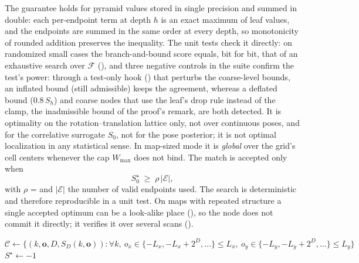 The guarantee holds for pyramid values stored in single precision and summed in double: each per-endpoint term at depth $h$ is an exact maximum of leaf values, and the endpoints are summed in the same order at every depth, so monotonicity of rounded addition preserves the inequality. The unit tests check it directly: on randomized small cases the branch-and-bound score equals, bit for bit, that of an exhaustive search over $\mathcal{F}$ (), and three negative controls in the suite confirm the test's power: through a test-only hook () that perturbs the coarse-level bounds, an inflated bound (still admissible) keeps the agreement, whereas a deflated bound ($0.8\,S_h$) and coarse nodes that use the leaf's drop rule instead of the clamp, the inadmissible bound of the proof's remark, are both detected. It is optimality on the rotation--translation lattice only, not over continuous poses, and for the correlative surrogate $S_0$, not for the pose posterior; it is not optimal localization in any statistical sense. In map-sized mode it is \emph{global} over the grid's cell centers whenever the cap $W_{\max}$ does not bind. The match is accepted only when
\begin{equation}\label{eq:bbsaccept}
  S_0^\star \;\ge\; \rho\,|\mathcal{E}|,
\end{equation}
with $\rho$ =  and $|\mathcal{E}|$ the number of valid endpoints used. The search is deterministic and therefore reproducible in a unit test. On maps with repeated structure a single accepted optimum can be a look-alike place (), so the node does not commit it directly; it verifies it over several scans ().

\begin{algorithm}[t]
\caption{Branch-and-bound global relocalization ()}\label{alg:bbs}
$\mathcal{C}\gets\{(k,\mathbf{o},D,S_D(k,\mathbf{o})) : \forall k,\ o_x\in\{-L_x,-L_x+2^D,\dots\}\le L_x,\ o_y\in\{-L_y,-L_y+2^D,\dots\}\le L_y\}$\;
$S^\star\gets-1$\;
\;
\end{algorithm}

